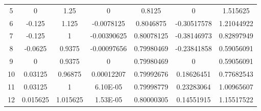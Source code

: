 \begin{table}[H]
\begin{tabular}{c|cccccc|}
    \multicolumn{1}{|c|}{5}  & 0                                          & 1.25                                 & 0                                               & 0.8125                                   & 0                                                          & 1.515625                        \\ \cline{1-1}
    \multicolumn{1}{|c|}{6}  & -0.125                                     & 1.125                                & -0.0078125                                      & 0.8046875                                & -0.30517578                                                & 1.21044922                      \\ \cline{1-1}
    \multicolumn{1}{|c|}{7}  & -0.125                                     & 1                                    & -0.00390625                                     & 0.80078125                               & -0.38146973                                                & 0.82897949                      \\ \cline{1-1}
    \multicolumn{1}{|c|}{8}  & -0.0625                                    & 0.9375                               & -0.00097656                                     & 0.79980469                               & -0.23841858                                                & 0.59056091                      \\ \cline{1-1}
    \multicolumn{1}{|c|}{9}  & 0                                          & 0.9375                               & 0                                               & 0.79980469                               & 0                                                          & 0.59056091                      \\ \cline{1-1}
    \multicolumn{1}{|c|}{10} & 0.03125                                    & 0.96875                              & 0.00012207                                      & 0.79992676                               & 0.18626451                                                 & 0.77682543                      \\ \cline{1-1}
    \multicolumn{1}{|c|}{11} & 0.03125                                    & 1                                    & 6.10E-05                                        & 0.79998779                               & 0.23283064                                                 & 1.00965607                      \\ \cline{1-1}
    \multicolumn{1}{|c|}{12} & 0.015625                                   & 1.015625                             & 1.53E-05                                        & 0.80000305                               & 0.14551915                                                 & 1.15517522                      \\ \cline{1-1}

\end{tabular}
\end{table}
